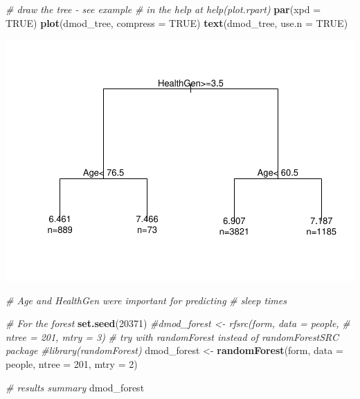 \documentclass[]{article}
\newenvironment{Shaded}{\begin{snugshade}}{\end{snugshade}}
\newcommand{\KeywordTok}[1]{\textcolor[rgb]{0.13,0.29,0.53}{\textbf{{#1}}}}
\newcommand{\DataTypeTok}[1]{\textcolor[rgb]{0.13,0.29,0.53}{{#1}}}
\newcommand{\DecValTok}[1]{\textcolor[rgb]{0.00,0.00,0.81}{{#1}}}
\newcommand{\StringTok}[1]{\textcolor[rgb]{0.31,0.60,0.02}{{#1}}}
\newcommand{\CommentTok}[1]{\textcolor[rgb]{0.56,0.35,0.01}{\textit{{#1}}}}
\newcommand{\OtherTok}[1]{\textcolor[rgb]{0.56,0.35,0.01}{{#1}}}
\newcommand{\NormalTok}[1]{{#1}}
\begin{document}
\begin{Shaded}
\begin{Highlighting}[]
\CommentTok{# draw the tree - see example}
\CommentTok{# in the help at help(plot.rpart)}
\KeywordTok{par}\NormalTok{(}\DataTypeTok{xpd =} \OtherTok{TRUE}\NormalTok{)}
\KeywordTok{plot}\NormalTok{(dmod_tree, }\DataTypeTok{compress =} \OtherTok{TRUE}\NormalTok{)}
\KeywordTok{text}\NormalTok{(dmod_tree, }\DataTypeTok{use.n =} \OtherTok{TRUE}\NormalTok{)}
\end{Highlighting}
\end{Shaded}

\includegraphics{Hmwk7AnswerKey_files/figure-latex/unnamed-chunk-28-1.pdf}

\begin{Shaded}
\begin{Highlighting}[]
\CommentTok{# Age and HealthGen were important for predicting}
\CommentTok{# sleep times}

\CommentTok{# For the forest}
\KeywordTok{set.seed}\NormalTok{(}\DecValTok{20371}\NormalTok{)}
\CommentTok{#dmod_forest <- rfsrc(form, data = people, }
\CommentTok{#                     ntree = 201, mtry = 3)}
\CommentTok{# try with randomForest instead of randomForestSRC package}
\CommentTok{#library(randomForest)}
\NormalTok{dmod_forest <-}\StringTok{ }\KeywordTok{randomForest}\NormalTok{(form, }\DataTypeTok{data =} \NormalTok{people, }
                     \DataTypeTok{ntree =} \DecValTok{201}\NormalTok{, }\DataTypeTok{mtry =} \DecValTok{2}\NormalTok{)}

\CommentTok{# results summary}
\NormalTok{dmod_forest}
\end{Highlighting}
\end{Shaded}
\end{document}
